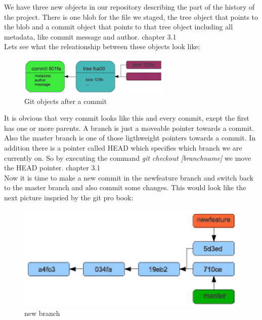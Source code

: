 We have three new objects in our repository describing the part of the history
of the project. There is one blob for the file we staged, the tree object that
points to the blob and a commit object that points to that tree object including
all metadata, like commit message and author. \cite{gitpro2009} chapter 3.1 \\

Lets see what the releationship between these objects look like:

\begin{figure}[h]
  \includegraphics{img/branch2}
  \caption{Git objects after a commit}
  \label{fig: git objects after a commit}
\end{figure}

It is obvious that very commit looks like this and every commit, exept the first
has one or more parents.
A branch is just a moveable pointer towards a commit. Also the master branch is
one of those ligthweight pointers towards a commit. In addition there is a
pointer called HEAD which specifies which branch we are currently on. So by
executing the command \emph{git checkout [branchname]} we move the HEAD
pointer.\cite{gitpro2009} chapter 3.1 \\

Now it is time to make a new commit in the newfeature branch and switch back to
the master branch and also commit some changes.
This would look like the next picture inspried by the git pro book:

\begin{figure}[h]
  \includegraphics{img/branch1}
  \caption{new branch}
  \label{fig: a new branch}
\end{figure}

